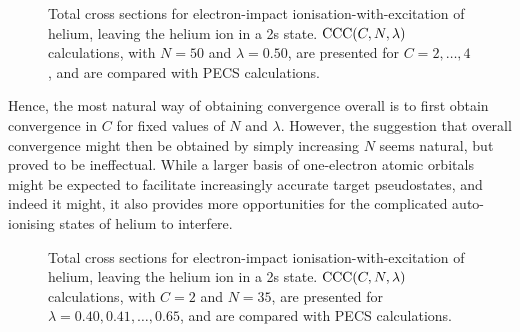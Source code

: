 \documentclass[]{article}
\begin{document}
\begin{figure}[h]
  \begin{center}
    
  \end{center}
  \caption[TICS-with-excitation: $\mathrm{CCC}\lr{C, 50, 0.50}$]{
    Total cross sections for electron-impact ionisation-with-excitation of
    helium, leaving the helium ion in a 2s state.
    $\mathrm{CCC}(C, N, \lambda)$ calculations, with $N = 50$ and
    $\lambda = 0.50$, are presented for $C = 2, \dotsc, 4$, and are compared
    with PECS \cite{PhysRevA.81.022716} calculations.
  }
  \label{fig:cs_tics_ie_n_50}
\end{figure}

\clearpage


Hence, the most natural way of obtaining convergence overall is to first obtain
convergence in $C$ for fixed values of $N$ and $\lambda$.
However, the suggestion that overall convergence might then be obtained by
simply increasing $N$ seems natural, but proved to be ineffectual.
While a larger basis of one-electron atomic orbitals might be expected to
facilitate increasingly accurate target pseudostates, and indeed it might, it
also provides more opportunities for the complicated auto-ionising states of
helium to interfere.



\begin{figure}[h]
  \begin{center}
    
  \end{center}
  \caption[TICS-with-excitation: $\mathrm{CCC}\lr{2, 35, \lambda}$]{
    Total cross sections for electron-impact ionisation-with-excitation of
    helium, leaving the helium ion in a 2s state.
    $\mathrm{CCC}(C, N, \lambda)$ calculations, with $C = 2$ and $N = 35$,
    are presented for $\lambda = 0.40, 0.41, \dotsc, 0.65$, and are compared
    with PECS \cite{PhysRevA.81.022716} calculations.
  }
  \label{fig:cs_tics_ie_alpha}
\end{figure}
\end{document}
